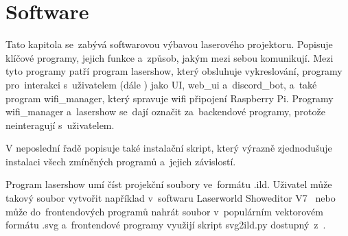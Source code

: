 \chapter{Software}

Tato kapitola se~zabývá softwarovou výbavou laserového projektoru. Popisuje klíčové programy, jejich funkce a~způsob, jakým mezi sebou komunikují.
Mezi tyto programy patří program lasershow, který obsluhuje vykreslování, programy pro~interakci s~uživatelem (dále ) jako UI, web\_ui a~discord\_bot, a~také program wifi\_manager, který spravuje wifi připojení Raspberry Pi.
Programy wifi\_manager a~lasershow se~dají označit za~backendové programy, protože neinteragují s~uživatelem.

V neposlední řadě popisuje také instalační skript, který výrazně zjednodušuje instalaci všech zmíněných programů a~jejich závislostí.

Program lasershow umí číst projekční soubory ve~formátu .ild.
Uživatel může takový soubor vytvořit například v~softwaru Laserworld Showeditor V7~\cite{showeditor} nebo může do~frontendových programů nahrát soubor v~populárním vektorovém formátu .svg a~frontendové programy využijí skript svg2ild.py dostupný~z~\cite{svg2ild}.




